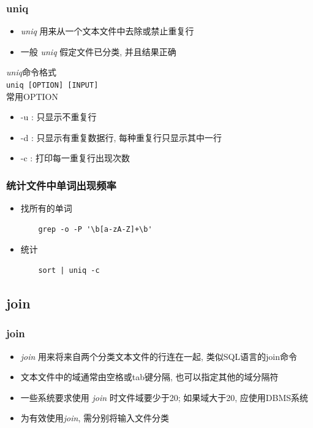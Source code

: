 \documentclass[compress]{beamer}
\begin{document}
\begin{frame}[fragile]
\frametitle{uniq}
\begin{itemize}
\item  \emph{uniq} 用来从一个文本文件中去除或禁止重复行
\item 一般 \emph{uniq} 假定文件已分类, 并且结果正确
\end{itemize}
\emph{uniq}命令格式\\
\verb~uniq [OPTION] [INPUT]~\\
常用OPTION
\begin{itemize}
\item -u : 只显示不重复行
\item -d : 只显示有重复数据行, 每种重复行只显示其中一行
\item -c : 打印每一重复行出现次数
\end{itemize}

\end{frame}

\begin{frame}[fragile]
    \frametitle{统计文件中单词出现频率}

    \begin{itemize}
    \item <+-> 找所有的单词
\begin{Verbatim}
    grep -o -P '\b[a-zA-Z]+\b'    
\end{Verbatim}
    \item <+-> 统计
\begin{Verbatim}
    sort | uniq -c   
\end{Verbatim}
\end{itemize}
\end{frame}

\subsection{join}

\begin{frame}
\frametitle{join}
\begin{itemize}
\item \emph{join} 用来将来自两个分类文本文件的行连在一起, 类似SQL语言的join命令
\item 文本文件中的域通常由空格或tab键分隔, 也可以指定其他的域分隔符
\item 一些系统要求使用 \emph{join} 时文件域要少于20; 如果域大于20, 应使用DBMS系统
\item 为有效使用\emph{join}, 需分别将输入文件分类
\end{itemize}

\end{frame}
\end{document}
